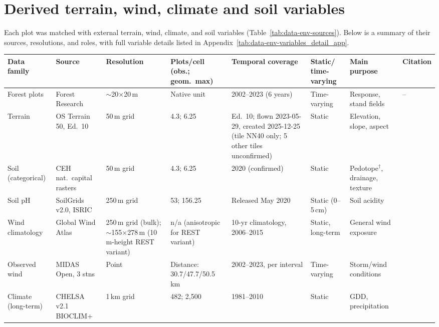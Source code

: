 \section{Derived terrain, wind, climate and soil variables}
\label{sec:data-environmental}

Each plot was matched with external terrain, wind, climate, and soil variables (Table~\ref{tab:data-env-sources}). Below is a summary of their sources, resolutions, and roles, with full variable details listed in Appendix~\ref{tab:data-env-variables_detail_app}.

\begin{table}[!htbp]
\tiny
\setlength{\tabcolsep}{2pt}
\renewcommand{\arraystretch}{0.9}
\begin{tabular}{p{1.6cm}p{2.1cm}p{1.6cm}p{1.5cm}p{2.3cm}p{1.6cm}p{2.3cm}p{0.7cm}}
\hline
Data family & Source & Resolution & Plots/cell (obs.; geom.\ max) & Temporal coverage & Static/ time-varying & Main purpose & Citation \\
\hline
Forest plots & Forest Research & $\sim$20$\times$20\,m & Native unit & 2002--2023 (6 years) & Time-varying & Response, stand fields & -- \\
Terrain & OS Terrain 50, Ed.\ 10 & 50\,m grid & 4.3; 6.25 & Ed.\ 10; flown 2023-05-29, created 2025-12-25 (tile NN40 only; 5 other tiles unconfirmed) & Static & Elevation, slope, aspect & \cite{ordnancesurveyTerrain50_C3_LID} \\
Soil (categorical) & CEH nat.\ capital rasters & 50\,m grid & 4.3; 6.25 & 2020 (confirmed) & Static & Pedotope$^{\dagger}$, drainage, texture & \cite{feeney2026CEHNaturalCapital_C3_LID} \\
Soil pH & SoilGrids v2.0, ISRIC & 250\,m grid & 53; 156.25 & Released May 2020 & Static (0--5\,cm) & Soil acidity & \cite{poggio2021SoilGrids_C3_LID} \\
Wind climatology & Global Wind Atlas & 250\,m grid (bulk); $\sim$155$\times$278\,m (10\,m-height REST variant) & n/a (anisotropic for REST variant) & 10-yr climatology, 2006--2015 & Static, long-term & General wind exposure & \cite{davis2023GlobalWindAtlas_C3_LID} \\
Observed wind & MIDAS Open, 3 stns & Point & Distance: 30.7/47.7/50.5\,km & 2002--2023, per interval & Time-varying & Storm/wind conditions & \cite{metoffice2019MIDASOpen_C3_LID} \\
Climate (long-term) & CHELSA v2.1 BIOCLIM+ & 1\,km grid & 482; 2{,}500 & 1981--2010 & Static & GDD, precipitation & \cite{karger2017CHELSA_C3_LID} \\

\end{tabular}
\end{table}
